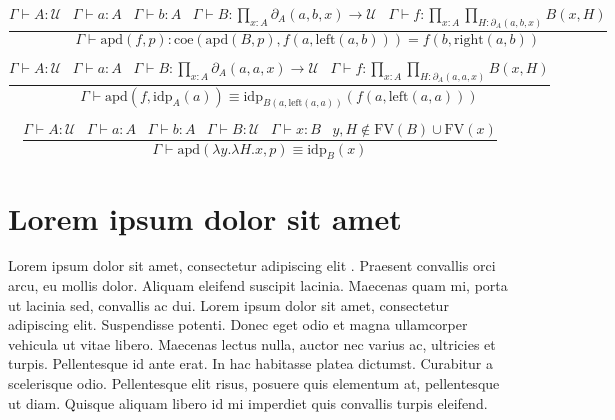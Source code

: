 \documentclass[a4paper,UKenglish,cleveref, autoref, thm-restate]{lipics-v2021}
\newcommand{\UU}{\ensuremath{\mathcal{U}}}
\begin{document}
\begin{equation*}
    \frac{\Gamma \vdash A : \UU \hspace{10pt} \Gamma \vdash a : A \hspace{10pt} \Gamma \vdash b : A \hspace{10pt} \Gamma \vdash B : \prod_{x : A} \partial_A(a, b, x) \rightarrow \UU \hspace{10pt} \Gamma \vdash f : \prod_{x : A} \prod_{H : \partial_A(a, b, x)} B(x, H)}{\Gamma \vdash \mathrm{apd}(f, p) : \mathrm{coe}(\mathrm{apd}(B, p), f(a, \mathrm{left}(a, b))) = f(b, \mathrm{right}(a, b))}
\end{equation*}

\begin{equation*}
    \frac{\Gamma \vdash A : \UU \hspace{10pt} \Gamma \vdash a : A \hspace{10pt} \Gamma \vdash B : \prod_{x : A} \partial_A(a, a, x) \rightarrow \UU \hspace{10pt} \Gamma \vdash f : \prod_{x : A} \prod_{H : \partial_A(a, a, x)} B(x, H)}{\Gamma \vdash \mathrm{apd}(f, \mathrm{idp}_A(a)) \equiv \mathrm{idp}_{B(a, \mathrm{left}(a, a))}(f(a, \mathrm{left}(a, a)))}
\end{equation*}

\begin{equation*}
    \frac{\Gamma \vdash A : \UU \hspace{10pt} \Gamma \vdash a : A \hspace{10pt} \Gamma \vdash b : A \hspace{10pt} \Gamma \vdash B : \UU \hspace{10pt} \Gamma \vdash x : B \hspace{10pt} y, H \notin \mathrm{FV}(B) \cup \mathrm{FV}(x)}{\Gamma \vdash \mathrm{apd}(\lambda y.\lambda H.x, p) \equiv \mathrm{idp}_B(x)}
\end{equation*}


\section{Lorem ipsum dolor sit amet}

Lorem ipsum dolor sit amet, consectetur adipiscing elit \cite{DBLP:journals/cacm/Knuth74}. Praesent convallis orci arcu, eu mollis dolor. Aliquam eleifend suscipit lacinia. Maecenas quam mi, porta ut lacinia sed, convallis ac dui. Lorem ipsum dolor sit amet, consectetur adipiscing elit. Suspendisse potenti. Donec eget odio et magna ullamcorper vehicula ut vitae libero. Maecenas lectus nulla, auctor nec varius ac, ultricies et turpis. Pellentesque id ante erat. In hac habitasse platea dictumst. Curabitur a scelerisque odio. Pellentesque elit risus, posuere quis elementum at, pellentesque ut diam. Quisque aliquam libero id mi imperdiet quis convallis turpis eleifend. 
\end{document}
